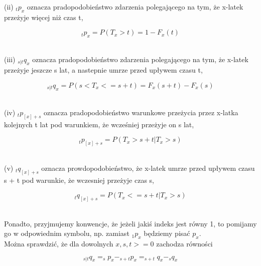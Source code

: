 \documentclass{article}
\begin{document}
(ii) $ _tp_x $ oznacza pradopodobieństwo zdarzenia polegającego na tym, że x-latek przeżyje więcej niż czas t,\\

\begin{center}
	\begin{equation}
		_tp_x = P(T_x > t) = 1 - F_x(t)
	\end{equation}
\end{center}\\

(iii) $ _{s|t}q_x $ oznacza pradopodobieństwo zdarzenia polegającego na tym, że x-latek przeżyje jeszcze s lat, a nastepnie umrze przed upływem czasu t,

\begin{center}
	\begin{equation}
		_{s|t}q_x = P(s < T_x <= s + t) = F_x(s + t) - F_x(s)
	\end{equation}
\end{center}\\

(iv) $ _tp_{[x] + s} $ oznacza pradopodobieństwo warunkowe przeżycia przez x-latka kolejnych t lat pod warunkiem, że wcześniej przeżyje on s lat,

\begin{center}
	\begin{equation}
		_tp_{[x] + s} = P(T_x > s + t|T_x > s)
	\end{equation}
\end{center}\\

(v) $ _tq_{[x]+s} $ oznacza prowdopodobieństwo, że x-latek umrze przed upływem czasu s + t pod warunkie, że wczesniej przeżyje czas s,

\begin{center}
	\begin{equation}
		_tq_{[x] + s} = P(T_x <= s + t|T_x > s)
	\end{equation}
\end{center}\\

Ponadto, przyjmujemy konwencje, że jeżeli jakiś indeks jest równy 1, to pomijamy go w odpowiednim symbolu, np. zamiast $ _1p_x $ będziemy pisać $ p_x $.\\

Można sprawdzić, że dla dowolnych $ x,s,t >= 0 $ zachodza równości

\begin{center}
	\begin{equation}
		_{s|t}q_x = _sp_x - _{s+t}p_x = _{s+t}q_x - _sq_x
	\end{equation}
\end{center}\\
\end{document}
